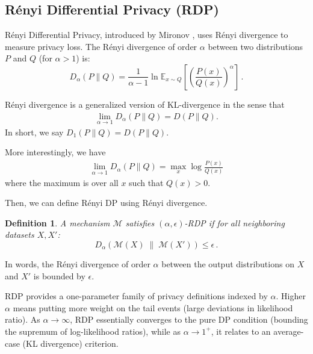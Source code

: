 \documentclass[11pt, a4paper]{article}
\newtheorem{definition}{Definition}
\begin{document}
\subsection{Rényi Differential Privacy (RDP)}
Rényi Differential Privacy, introduced by Mironov \cite{Mironov2017}, uses Rényi divergence to measure privacy loss.
The Rényi divergence of order $\alpha$ between two distributions $P$ and $Q$ (for $\alpha > 1$) is:
\[ D_{\alpha}(P \| Q) = \frac{1}{\alpha-1} \ln \mathbb{E}_{x \sim Q}\left[\left(\frac{P(x)}{Q(x)}\right)^{\alpha}\right]\,. \]

Rényi divergence is a generalized version of KL-divergence in the sense that
\begin{align}
    \lim_{\alpha\rightarrow 1} D_{\alpha}(P\|Q) = D(P\|Q).
\end{align}
In short, we say $D_1(P\|Q) = D(P\|Q)$.

More interestingly, we have
\begin{align}
    \lim_{\alpha\rightarrow 1} D_{\alpha}(P\|Q) = \max_x \log \frac{P(x)}{Q(x)}
\end{align}
where the maximum is over all $x$ such that $Q(x)>0$.

Then, we can define Rényi DP using Rényi divergence.
\begin{definition}
A mechanism $\mathcal{M}$ satisfies $(\alpha, \epsilon)$-RDP if for all neighboring datasets $X, X'$:
\[ D_{\alpha}(\mathcal{M}(X) \; \| \; \mathcal{M}(X')) \le \epsilon\,. \]
\end{definition}
In words, the Rényi divergence of order $\alpha$ between the output distributions on $X$ and $X'$ is bounded by $\epsilon$. 

RDP provides a one-parameter family of privacy definitions indexed by $\alpha$.
Higher $\alpha$ means putting more weight on the tail events (large deviations in likelihood ratio).
As $\alpha \to \infty$, RDP essentially converges to the pure DP condition (bounding the supremum of log-likelihood ratios),
while as $\alpha \to 1^+$, it relates to an average-case (KL divergence) criterion.
\end{document}
